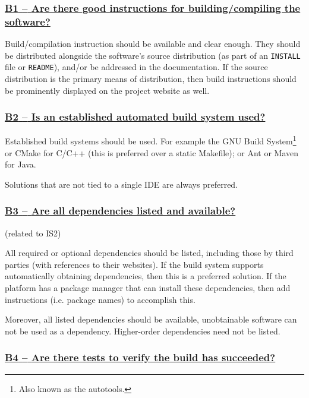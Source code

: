 \documentclass[a4paper,11pt]{article}
\newcommand{\indicator}[1]{\subsubsection*{\underline{#1}}}
\begin{document}
\newcommand{\bOneName}{B1}
\newcommand{\bOneID}{\bOneName}
\newcommand{\bOneText}{Are there good instructions for building/compiling the software?}
\indicator{\bOneName{ }--{ }\bOneText}\label{id:b1} 

Build/compilation instruction should be available and clear enough. They should
be distributed alongside the software's source distribution (as part of an
\texttt{INSTALL} file or \texttt{README}), and/or be addressed in the documentation. If the
source distribution is the primary means of distribution, then build
instructions should be prominently displayed on the project website as well.

\newcommand{\bTwoName}{B2}
\newcommand{\bTwoID}{\bTwoName}
\newcommand{\bTwoText}{Is an established automated build system used?}
\indicator{\bTwoName{ }--{ }\bTwoText}\label{id:b2} 

Established build systems should be used. For example the GNU Build
System\footnote{Also known as the autotools.} or CMake for C/C++ (this is
preferred over a static Makefile); or Ant or Maven for Java. 

Solutions that are not tied to a single IDE are always preferred.

\newcommand{\bThreeName}{B3}
\newcommand{\bThreeID}{\bThreeName}
\newcommand{\bThreeText}{Are all dependencies listed and available?}
\indicator{\bThreeName{ }--{ }\bThreeText}\label{id:b3}
(related to IS2)

All required or optional dependencies should be listed, including those by
third parties (with references to their websites). If the build system supports
automatically obtaining dependencies, then this is a preferred solution. If the
platform has a package manager that can install these dependencies, then add
instructions (i.e. package names) to accomplish this.

Moreover, all listed dependencies should be available, unobtainable software
can not be used as a dependency. Higher-order dependencies need not be listed.

\newcommand{\bFourName}{B4}
\newcommand{\bFourID}{\bFourName}
\newcommand{\bFourText}{Are there tests to verify the build has succeeded?}
\indicator{\bFourName{ }--{ }\bFourText}\label{id:b4} 
\end{document}
